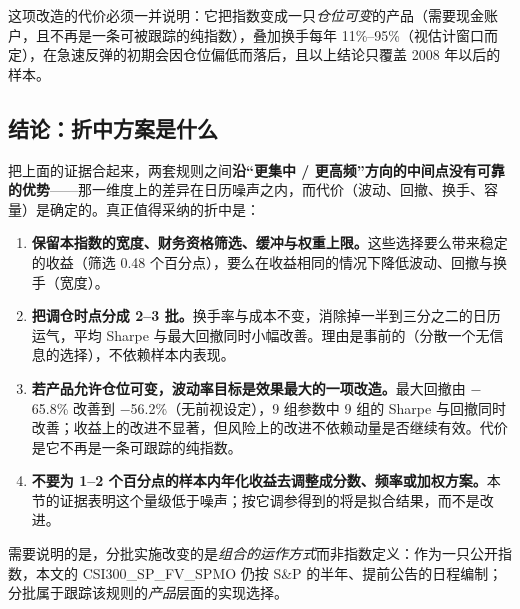 \documentclass[11pt,a4paper]{article}
\begin{document}
这项改造的代价必须一并说明：它把指数变成一只\emph{仓位可变}的产品（需要现金账户，且不再是一条可被跟踪的纯指数），叠加换手每年 11\%--95\%（视估计窗口而定），在急速反弹的初期会因仓位偏低而落后，且以上结论只覆盖 2008 年以后的样本。
\FloatBarrier
\subsection{结论：折中方案是什么}
把上面的证据合起来，两套规则之间\textbf{沿“更集中 / 更高频”方向的中间点没有可靠的优势}——那一维度上的差异在日历噪声之内，而代价（波动、回撤、换手、容量）是确定的。真正值得采纳的折中是：
\begin{enumerate}[leftmargin=2em,itemsep=2pt]
\item \textbf{保留本指数的宽度、财务资格筛选、缓冲与权重上限。}这些选择要么带来稳定的收益（筛选 0.48 个百分点），要么在收益相同的情况下降低波动、回撤与换手（宽度）。
\item \textbf{把调仓时点分成 2--3 批。}换手率与成本不变，消除掉一半到三分之二的日历运气，平均 Sharpe 与最大回撤同时小幅改善。理由是事前的（分散一个无信息的选择），不依赖样本内表现。
\item \textbf{若产品允许仓位可变，波动率目标是效果最大的一项改造。}最大回撤由 $-$65.8\% 改善到 $-$56.2\%（无前视设定），9 组参数中 9 组的 Sharpe 与回撤同时改善；收益上的改进不显著，但风险上的改进不依赖动量是否继续有效。代价是它不再是一条可跟踪的纯指数。
\item \textbf{不要为 1--2 个百分点的样本内年化收益去调整成分数、频率或加权方案。}本节的证据表明这个量级低于噪声；按它调参得到的将是拟合结果，而不是改进。
\end{enumerate}
需要说明的是，分批实施改变的是\emph{组合的运作方式}而非指数定义：作为一只公开指数，本文的 CSI300\_SP\_FV\_SPMO 仍按 S\&P 的半年、提前公告的日程编制；分批属于跟踪该规则的\emph{产品}层面的实现选择。
\end{document}
